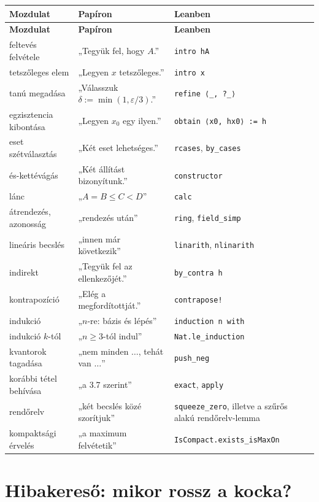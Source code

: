 \documentclass[11pt,a4paper]{article}
\newcommand{\lean}[1]{\texttt{\small #1}}
\newcommand{\eps}{\varepsilon}
\theoremstyle{definition}
\begin{document}
\begingroup
\small
\begin{longtable}{@{}p{4.4cm}p{5.4cm}p{4.6cm}@{}}
\toprule
\textbf{Mozdulat} & \textbf{Papíron} & \textbf{Leanben} \\
\midrule
\endfirsthead
\toprule
\textbf{Mozdulat} & \textbf{Papíron} & \textbf{Leanben} \\
\midrule
\endhead
\bottomrule
\endfoot
feltevés felvétele & „Tegyük fel, hogy $A$.” & \lean{intro hA} \\
tetszőleges elem & „Legyen $x$ tetszőleges.” & \lean{intro x} \\
tanú megadása & „Válasszuk $\delta:=\min(1,\eps/3)$.” & \lean{refine ⟨\_, ?\_⟩} \\
egzisztencia kibontása & „Legyen $x_0$ egy ilyen.” & \lean{obtain ⟨x0, hx0⟩ := h} \\
eset szétválasztás & „Két eset lehetséges.” & \lean{rcases}, \lean{by\_cases} \\
és-kettévágás & „Két állítást bizonyítunk.” & \lean{constructor} \\
lánc & „$A = B \le C < D$” & \lean{calc} \\
átrendezés, azonosság & „rendezés után” & \lean{ring}, \lean{field\_simp} \\
lineáris becslés & „innen már következik” & \lean{linarith}, \lean{nlinarith} \\
indirekt & „Tegyük fel az ellenkezőjét.” & \lean{by\_contra h} \\
kontrapozíció & „Elég a megfordítottját.” & \lean{contrapose!} \\
indukció & „$n$-re: bázis és lépés” & \lean{induction n with} \\
indukció $k$-tól & „$n\ge3$-tól indul” & \lean{Nat.le\_induction} \\
kvantorok tagadása & „nem minden $\dots$, tehát van $\dots$” & \lean{push\_neg} \\
korábbi tétel behívása & „a 3.7 szerint” & \lean{exact}, \lean{apply} \\
rendőrelv & „két becslés közé szorítjuk” & \lean{squeeze\_zero}, illetve a szűrős alakú rendőrelv-lemma \\
kompaktsági érvelés & „a maximum felvétetik” & \lean{IsCompact.exists\_isMaxOn} \\
\end{longtable}
\endgroup

\section{Hibakereső: mikor rossz a kocka?}
\end{document}

